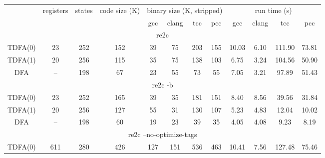 \documentclass{article}
\theoremstyle{definition}
\begin{document}



\begin{center}
    \bigskip
    \begin{tabular}{|c|ccccccccccc|}
    \hline
    & registers & states & code size (K) & \multicolumn{4}{c}{binary size (K, stripped)} & \multicolumn{4}{c|}{run time (s)} \\
    & & &
        & gcc & clang & tcc & pcc
        & gcc & clang & tcc & pcc \\
    \hline \hline
    \multicolumn{12}{|c|}{re2c} \\
    \hline
    TDFA(0) & 23 & 252 & 152 & 39 & 75 & 203 & 155 & 10.03 & 6.10 & 111.90 & 73.81 \\
    TDFA(1) & 20 & 256 & 115 & 35 & 75 & 138 & 103 &  6.75 & 3.24 & 104.56 & 50.90 \\
    DFA     & -- & 198 &  67 & 23 & 55 &  73 &  55 &  7.05 & 3.21 &  97.89 & 51.43 \\
    \hline \hline
    \multicolumn{12}{|c|}{re2c -b} \\
    \hline
    TDFA(0) & 23 & 252 & 165 & 39 & 35 & 181 & 151 & 8.40 & 8.56 & 39.56 & 31.84 \\
    TDFA(1) & 20 & 256 & 127 & 55 & 31 & 130 & 107 & 5.23 & 4.83 & 12.04 & 10.02 \\
    DFA     & -- & 198 &  60 & 19 & 23 &  39 &  35 & 4.05 & 4.08 &  9.23 &  8.19 \\
    \hline \hline
    \multicolumn{12}{|c|}{re2c --no-optimize-tags} \\
    \hline
    TDFA(0) & 611 & 280 & 426 & 127 & 151 & 536 & 463 & 10.41 & 7.56 & 127.48 & 75.46 \\

\end{tabular}
\end{center}
\end{document}
